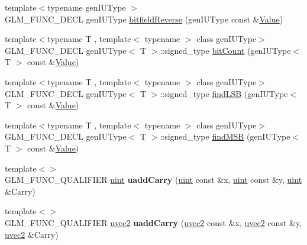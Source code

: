 \begin{DoxyCompactItemize}
\item 
{\footnotesize template$<$typename gen\+I\+U\+Type $>$ }\\G\+L\+M\+\_\+\+F\+U\+N\+C\+\_\+\+D\+E\+CL gen\+I\+U\+Type \hyperlink{group__core__func__integer_gac28880e609c6eeb0a28f1a54b1edc715}{bitfield\+Reverse} (gen\+I\+U\+Type const \&\hyperlink{document_8h_a071cf97155ba72ac9a1fc4ad7e63d481}{Value})
\item 
{\footnotesize template$<$typename T , template$<$ typename $>$ class gen\+I\+U\+Type$>$ }\\G\+L\+M\+\_\+\+F\+U\+N\+C\+\_\+\+D\+E\+CL gen\+I\+U\+Type$<$ T $>$\+::signed\+\_\+type \hyperlink{group__core__func__integer_gaf5ecf64cbcb7f806a3c7915dd622209b}{bit\+Count} (gen\+I\+U\+Type$<$ T $>$ const \&\hyperlink{document_8h_a071cf97155ba72ac9a1fc4ad7e63d481}{Value})
\item 
{\footnotesize template$<$typename T , template$<$ typename $>$ class gen\+I\+U\+Type$>$ }\\G\+L\+M\+\_\+\+F\+U\+N\+C\+\_\+\+D\+E\+CL gen\+I\+U\+Type$<$ T $>$\+::signed\+\_\+type \hyperlink{group__core__func__integer_ga43d5d9ec05ba4c46035c764ad5fd3135}{find\+L\+SB} (gen\+I\+U\+Type$<$ T $>$ const \&\hyperlink{document_8h_a071cf97155ba72ac9a1fc4ad7e63d481}{Value})
\item 
{\footnotesize template$<$typename T , template$<$ typename $>$ class gen\+I\+U\+Type$>$ }\\G\+L\+M\+\_\+\+F\+U\+N\+C\+\_\+\+D\+E\+CL gen\+I\+U\+Type$<$ T $>$\+::signed\+\_\+type \hyperlink{group__core__func__integer_gaee931af2eaecf61b629b33899c9d6f29}{find\+M\+SB} (gen\+I\+U\+Type$<$ T $>$ const \&\hyperlink{document_8h_a071cf97155ba72ac9a1fc4ad7e63d481}{Value})
\item 
{\footnotesize template$<$$>$ }\\G\+L\+M\+\_\+\+F\+U\+N\+C\+\_\+\+Q\+U\+A\+L\+I\+F\+I\+ER \hyperlink{group__core__precision_ga4fd29415871152bfb5abd588334147c8}{uint} {\bfseries uadd\+Carry} (\hyperlink{group__core__precision_ga4fd29415871152bfb5abd588334147c8}{uint} const \&x, \hyperlink{group__core__precision_ga4fd29415871152bfb5abd588334147c8}{uint} const \&y, \hyperlink{group__core__precision_ga4fd29415871152bfb5abd588334147c8}{uint} \&Carry)\hypertarget{namespaceglm_a58f7d2bd0bc8d3af9e362e904fd20aa3}{}\label{namespaceglm_a58f7d2bd0bc8d3af9e362e904fd20aa3}

\item 
{\footnotesize template$<$$>$ }\\G\+L\+M\+\_\+\+F\+U\+N\+C\+\_\+\+Q\+U\+A\+L\+I\+F\+I\+ER \hyperlink{group__core__types_gafd2041b45eff671aa8899d2c2835eee9}{uvec2} {\bfseries uadd\+Carry} (\hyperlink{group__core__types_gafd2041b45eff671aa8899d2c2835eee9}{uvec2} const \&x, \hyperlink{group__core__types_gafd2041b45eff671aa8899d2c2835eee9}{uvec2} const \&y, \hyperlink{group__core__types_gafd2041b45eff671aa8899d2c2835eee9}{uvec2} \&Carry)\hypertarget{namespaceglm_a9dab4b979638deec548f2d2a3e1700a8}{}\label{namespaceglm_a9dab4b979638deec548f2d2a3e1700a8}


\end{DoxyCompactItemize}
